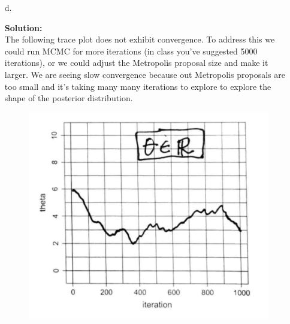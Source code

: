 \documentclass[12pt]{article}
\makeatletter
\theoremstyle{homework}
\newenvironment{exercise}[1]
{\def\@currentlabel{#1}\exercisecore}
{\endexercisecore}
\newcommand{\localhead}[1]{\par\smallskip\noindent\textbf{#1}\nobreak\\}%
\newcommand\solution{\localhead{Solution:}}
\makeatother
\begin{document}
\begin{exercise}{3}
\begin{enumerate}
    \item[d.] 
    \solution The following trace plot does not exhibit convergence. To address this we could run MCMC for more iterations (in class you've suggested 5000 iterations), or we could adjust the Metropolis proposal size and make it larger. 
    We are seeing slow convergence because out Metropolis proposals are too small and it's taking many many iterations to explore to explore the shape of the posterior distribution. 
    \begin{figure}[H]
      \begin{center}
      \includegraphics[width = .6\textwidth]{Traceplot4.png}
      \end{center}
    \end{figure} 
  \end{enumerate}
\end{exercise}

\vspace{.5in}
\end{document}
